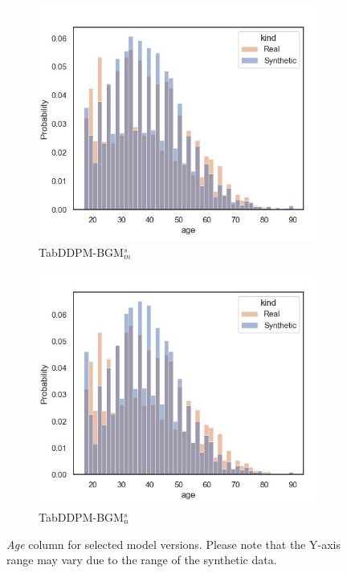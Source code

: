 \begin{figure}[h]
\begin{subfigure}{0.23\textwidth}
		\includegraphics[width=\textwidth]{images/dist_age/tab-ddpm-bgm-simTune-minmax.jpg}
		\caption{TabDDPM-BGM$^{s}_m$}
	\end{subfigure}
	\begin{subfigure}{0.23\textwidth}
		\centering
		\includegraphics[width=\textwidth]{images/dist_age/tab-ddpm-bgm-simTune-none.jpg}
		\caption{TabDDPM-BGM$^{s}_n$}
	\end{subfigure}
	\caption[Distribution Plots Continuous]{\textit{Age} column for selected model versions. Please note that the Y-axis range may vary due to the range of the synthetic data.}
	\label{fig:age}
\end{figure}

